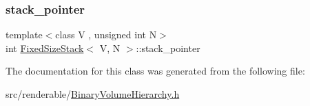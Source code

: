 \mbox{\label{classFixedSizeStack_a87e0a013c62888f127f57309e32ed70e}} 
\subsubsection{\texorpdfstring{stack\_pointer}{stack\_pointer}}
{\footnotesize\ttfamily template$<$class V , unsigned int N$>$ \\
int \mbox{\hyperlink{classFixedSizeStack}{Fixed\+Size\+Stack}}$<$ V, N $>$\+::stack\+\_\+pointer\hspace{0.3cm}{\ttfamily [private]}}



The documentation for this class was generated from the following file\+:\begin{DoxyCompactItemize}
\item 
src/renderable/\mbox{\hyperlink{BinaryVolumeHierarchy_8h}{Binary\+Volume\+Hierarchy.\+h}}\end{DoxyCompactItemize}
